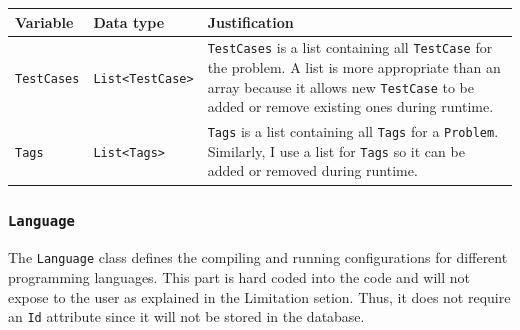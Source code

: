 \documentclass[a4paper]{report}
\begin{document}
\begin{tabulary}{\textwidth}{|l|l|L|}
    \hline
    Variable & Data type & Justification \\
    \hline
    \texttt{TestCases} & \texttt{List<TestCase>} & \texttt{TestCases} is a list containing all \texttt{TestCase} for the problem. A list is more appropriate than an array because it allows new \texttt{TestCase} to be added or remove existing ones during runtime. \\
    \hline
    \texttt{Tags} & \texttt{List<Tags>} & \texttt{Tags} is a list containing all \texttt{Tags} for a \texttt{Problem}. Similarly, I use a list for \texttt{Tags} so it can be added or removed during runtime. \\
    \hline
\end{tabulary}

\subsubsection{\texttt{Language}}

The \texttt{Language} class defines the compiling and running configurations for different programming languages. This part is hard coded into the code and will not expose to the user as explained in the Limitation setion. Thus, it does not require an \texttt{Id} attribute since it will not be stored in the database.
\end{document}
